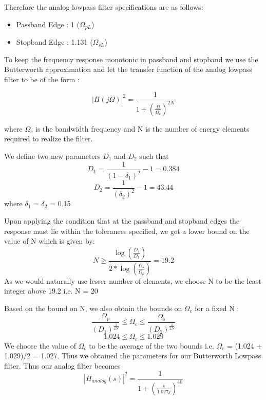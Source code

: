 \documentclass{article}
\begin{document}
\vspace{1em}
\noindent
Therefore the analog lowpass filter specifications are as follows:
\begin{itemize}
    \item Passband Edge : 1 ($\Omega_{pL}$)
    \item Stopband Edge : 1.131 ($\Omega_{sL}$)
\end{itemize}

To keep the frequency response monotonic in passband and stopband we use the Butterworth approximation and let the transfer function of the analog lowpass filter to be of the form : 

\begin{equation*}
    |H(j\Omega)|^2 = \frac{1}{1 + (\frac{\Omega}{\Omega_c})^{2N}}
\end{equation*}

where $\Omega_c$ is the bandwidth frequency and N is the number of energy elements required to realize the filter.

\vspace{1em}
\noindent
We define two new parameters $D_1$ and $D_2$ such that
\begin{equation*}
    D_1 = \frac{1}{(1 - \delta_1)^2} - 1 = 0.384
\end{equation*}
\begin{equation}
    D_2 = \frac{1}{(\delta_2)^2} - 1 = 43.44
\end{equation}
where $\delta_1$ = $\delta_2$ = 0.15

\vspace{1em}
\noindent
Upon applying the condition that at the passband and stopband edges the response must lie within the tolerances specified, we get a lower bound on the value of N which is given by:
\begin{equation*}
    N \geq \frac{\log(\frac{D_2}{D_1})}{2*\log(\frac{\Omega_s}{\Omega_p})} = 19.2
\end{equation*}
As we would naturally use lesser number of elements, we choose N to be the least integer above 19.2 i.e. N = 20

\vspace{1em}
\noindent
Based on the bound on N, we also obtain the bounds on $\Omega_c$ for a fixed N :
\begin{equation*}
    \frac{\Omega_p}{(D_1)^{\frac{1}{2N}}} \leq \Omega_c \leq \frac{\Omega_s}{(D_2)^{\frac{1}{2N}}}
\end{equation*}
\begin{equation*}
    1.024 \leq \Omega_c \leq 1.029
\end{equation*}
We choose the value of $\Omega_c$ to be the average of the two bounds i.e. $\Omega_c$ = (1.024 + 1.029)/2 = 1.027. Thus we obtained the parameters for our Butterworth Lowpass filter.
\noindent
\vspace{1em}
Thus our analog filter becomes 
\begin{equation*}
    |H_{analog}(s)|^2 = \frac{1}{1+(\frac{s}{1.027j})^{40}}
\end{equation*}
\end{document}
